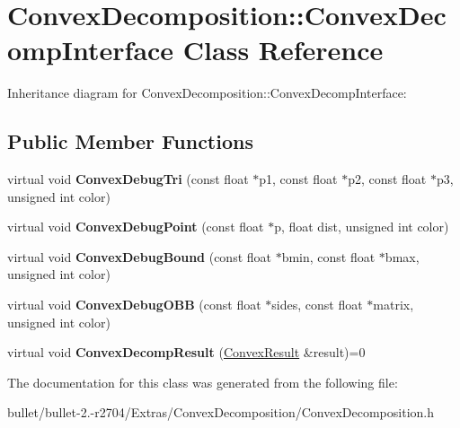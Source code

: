 \hypertarget{class_convex_decomposition_1_1_convex_decomp_interface}{\section{Convex\+Decomposition\+:\+:Convex\+Decomp\+Interface Class Reference}
\label{class_convex_decomposition_1_1_convex_decomp_interface}
}


Inheritance diagram for Convex\+Decomposition\+:\+:Convex\+Decomp\+Interface\+:
\subsection*{Public Member Functions}
\begin{DoxyCompactItemize}
\item 
\hypertarget{class_convex_decomposition_1_1_convex_decomp_interface_ade260062de37fce5e72918240bdf7750}{virtual void {\bfseries Convex\+Debug\+Tri} (const float $\ast$p1, const float $\ast$p2, const float $\ast$p3, unsigned int color)}\label{class_convex_decomposition_1_1_convex_decomp_interface_ade260062de37fce5e72918240bdf7750}

\item 
\hypertarget{class_convex_decomposition_1_1_convex_decomp_interface_a4eb2606379b4d7cea0b8122dfbd17a7b}{virtual void {\bfseries Convex\+Debug\+Point} (const float $\ast$p, float dist, unsigned int color)}\label{class_convex_decomposition_1_1_convex_decomp_interface_a4eb2606379b4d7cea0b8122dfbd17a7b}

\item 
\hypertarget{class_convex_decomposition_1_1_convex_decomp_interface_a57ef84132a1c95862f543eb249f96d77}{virtual void {\bfseries Convex\+Debug\+Bound} (const float $\ast$bmin, const float $\ast$bmax, unsigned int color)}\label{class_convex_decomposition_1_1_convex_decomp_interface_a57ef84132a1c95862f543eb249f96d77}

\item 
\hypertarget{class_convex_decomposition_1_1_convex_decomp_interface_a3ae71f8a41bdffd2e0ad7bba985fc46a}{virtual void {\bfseries Convex\+Debug\+O\+B\+B} (const float $\ast$sides, const float $\ast$matrix, unsigned int color)}\label{class_convex_decomposition_1_1_convex_decomp_interface_a3ae71f8a41bdffd2e0ad7bba985fc46a}

\item 
\hypertarget{class_convex_decomposition_1_1_convex_decomp_interface_a23b944ece0d378c5ced4eed6e66ae14a}{virtual void {\bfseries Convex\+Decomp\+Result} (\hyperlink{class_convex_decomposition_1_1_convex_result}{Convex\+Result} \&result)=0}\label{class_convex_decomposition_1_1_convex_decomp_interface_a23b944ece0d378c5ced4eed6e66ae14a}

\end{DoxyCompactItemize}


The documentation for this class was generated from the following file\+:\begin{DoxyCompactItemize}
\item 
bullet/bullet-\/2.-\/r2704/\+Extras/\+Convex\+Decomposition/Convex\+Decomposition.\+h\end{DoxyCompactItemize}
